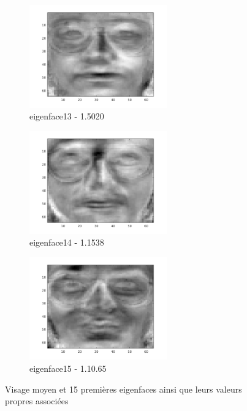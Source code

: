 \documentclass[a4paper]{article}
\begin{document}
\begin{figure}[H]
    \begin{subfigure}[c]{0.24\textwidth}
        \centering
        \includegraphics[width=0.65\textwidth]{images/ex2_x13.png}
        \caption{eigenface13 - 1.5020}
        \label{subfig:ex2_x13}
    \end{subfigure}
    \begin{subfigure}[c]{0.24\textwidth}
        \centering
        \includegraphics[width=0.65\textwidth]{images/ex2_x14.png}
        \caption{eigenface14 - 1.1538}
        \label{subfig:ex2_x14}
    \end{subfigure}
    \begin{subfigure}[c]{0.24\textwidth}
        \centering
        \includegraphics[width=0.65\textwidth]{images/ex2_x15.png}
        \caption{eigenface15 - 1.10.65}
        \label{subfig:ex2_x15}
    \end{subfigure}

    \caption{Visage moyen et 15 premières eigenfaces ainsi que leurs valeurs
    propres associées} 
    \label{fig:ex2-eigenfaces}
\end{figure}
\end{document}
